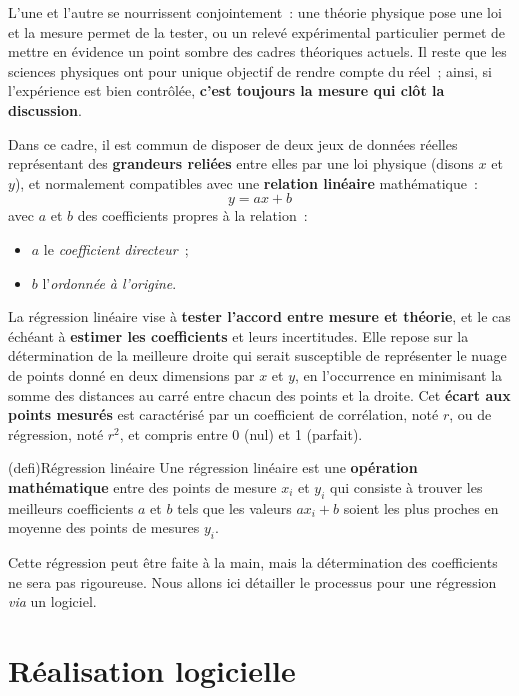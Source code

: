 \documentclass[a4paper, 12pt, garamond]{book}
\begin{document}
L'une et l'autre se nourrissent conjointement~: une théorie physique pose une
loi et la mesure permet de la tester, ou un relevé expérimental particulier
permet de mettre en évidence un point sombre des cadres théoriques actuels. Il
reste que les sciences physiques ont pour unique objectif de rendre compte du
réel~; ainsi, si l'expérience est bien contrôlée, \textbf{c'est toujours la
	mesure qui clôt la discussion}.

Dans ce cadre, il est commun de disposer de deux jeux de données réelles
représentant des \textbf{grandeurs reliées} entre elles par une
loi physique (disons $x$ et $y$), et normalement compatibles avec une
\textbf{relation linéaire} mathématique~:
\[
	\boxed{y = ax+b}
\]
avec $a$ et $b$ des coefficients propres à la relation~:
\begin{itemize}
	\item $a$ le \textit{coefficient directeur}~;
	\item $b$ l'\textit{ordonnée à l'origine}.
\end{itemize}

La régression linéaire vise à \textbf{tester l'accord entre mesure
  et théorie}, et le cas échéant à \textbf{estimer les coefficients} et leurs
incertitudes. Elle repose sur la détermination de la meilleure droite qui serait
susceptible de représenter le nuage de points donné en deux dimensions par $x$
et $y$, en l'occurrence en minimisant la somme des distances au carré entre
chacun des points et la droite. Cet \textbf{écart aux points mesurés} est
caractérisé par un coefficient de corrélation, noté $r$, ou de régression, noté
$r^{2}$, et compris entre 0 (nul) et 1 (parfait).

\begin{tcn}(defi){Régression linéaire}
  Une régression linéaire est une \textbf{opération mathématique} entre des
  points de mesure $x_i$ et $y_i$ qui consiste à trouver les meilleurs
  coefficients $a$ et $b$ tels que les valeurs $ax_i+b$ soient les plus proches
  en moyenne des points de mesures $y_i$.
\end{tcn}

Cette régression peut être faite à la main, mais la détermination des
coefficients ne sera pas rigoureuse. Nous allons ici détailler le processus pour
une régression \textit{via} un logiciel.

\section{Réalisation logicielle}
\end{document}
